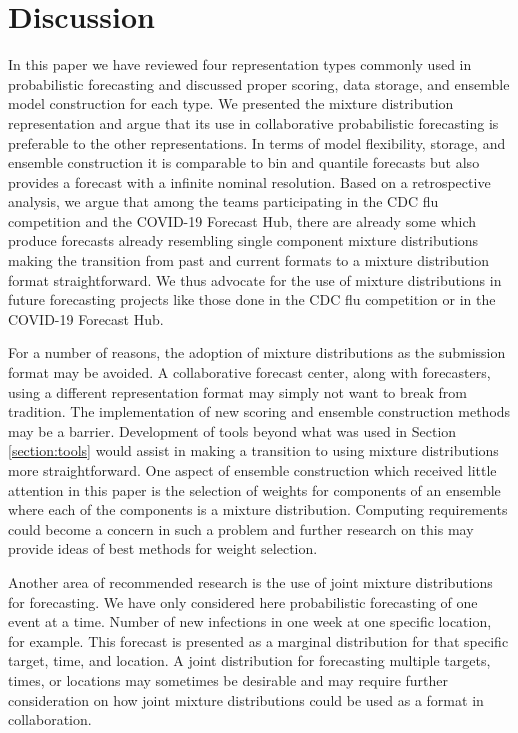 \documentclass[11pt,notitlepage]{isuthesis}
\begin{document}
\chapter{Discussion}

In this paper we have reviewed four representation types commonly used in
probabilistic 
forecasting and discussed proper scoring, data storage, and ensemble model 
construction for each type. We presented the mixture distribution
representation and argue that its use in collaborative probabilistic 
forecasting is preferable to the other representations.
In terms of model flexibility, storage, and 
ensemble construction it is
comparable to bin and quantile forecasts but also provides a 
forecast with a infinite nominal resolution. Based on a retrospective analysis,
we argue that among the teams participating in the CDC flu
competition and the COVID-19 Forecast Hub, there are already some which produce
forecasts already resembling single component mixture distributions making the 
transition from past and current formats to a mixture distribution format 
straightforward.
We thus advocate for the use of mixture distributions in
future forecasting projects like those done in the CDC flu competition or in the
COVID-19 Forecast Hub.

For a number of reasons, the adoption of mixture distributions as the
submission format may be avoided. A collaborative forecast center, along with 
forecasters, using a 
different representation format may simply not want to break from tradition. The 
implementation of new scoring and ensemble construction methods may be a 
barrier. Development of tools beyond what was used in Section 
\ref{section:tools} would assist in making a transition to using mixture 
distributions more straightforward.
One aspect of ensemble construction which received little attention in 
this paper is the selection of weights for components of an ensemble where each
of the components is a mixture distribution. 
Computing requirements could become a
concern in such a problem and further research on this may provide
ideas of best methods for weight selection.

Another area of recommended research is the use of joint mixture distributions 
for 
forecasting. We have only considered here probabilistic forecasting of one 
event at a time. Number of new infections in one week at one specific location,
for example. This forecast is presented as a marginal distribution for that 
specific target, time, and location. A joint distribution for forecasting 
multiple targets, times, or locations may sometimes be desirable and may require
further consideration on how joint mixture distributions could be used as a 
format in collaboration.
\end{document}
